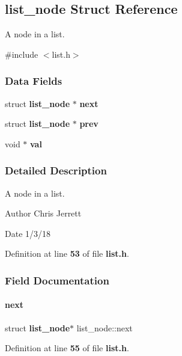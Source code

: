 \subsection{list\+\_\+node Struct Reference}
\label{structlist__node}


A node in a list.  




{\ttfamily \#include $<$list.\+h$>$}

\subsubsection*{Data Fields}
\begin{DoxyCompactItemize}
\item 
struct \textbf{ list\+\_\+node} $\ast$ \textbf{ next}
\item 
struct \textbf{ list\+\_\+node} $\ast$ \textbf{ prev}
\item 
void $\ast$ \textbf{ val}
\end{DoxyCompactItemize}


\subsubsection{Detailed Description}
A node in a list. 

\begin{DoxyAuthor}{Author}
Chris Jerrett 
\end{DoxyAuthor}
\begin{DoxyDate}{Date}
1/3/18 
\end{DoxyDate}


Definition at line \textbf{ 53} of file \textbf{ list.\+h}.



\subsubsection{Field Documentation}
\mbox{\label{structlist__node_a0b99ca890dbfe832a8475f4bbd72338c}} 
\paragraph{next}
{\footnotesize\ttfamily struct \textbf{ list\+\_\+node}$\ast$ list\+\_\+node\+::next}



Definition at line \textbf{ 55} of file \textbf{ list.\+h}.




